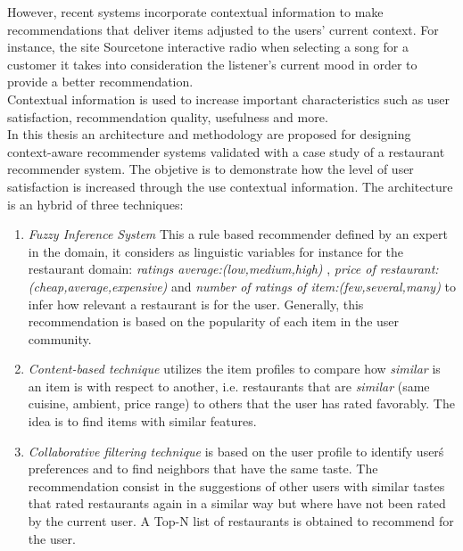 However, recent systems incorporate contextual
information to make recommendations that deliver items adjusted
to the users' current context. For instance, the site Sourcetone %
interactive radio \cite{huq2010automated} when selecting a song for
a customer it takes into consideration the listener's current mood in
order to provide a better recommendation. \\ Contextual information is used to
increase important characteristics such as user satisfaction, recommendation 
quality, usefulness and more.\\
In this thesis an architecture and methodology are proposed for designing context-aware
recommender systems validated with a case study of a restaurant recommender system. The objetive is to
demonstrate how the level of user satisfaction is increased through
the use contextual information. The architecture is an hybrid of three techniques:

\begin{enumerate}  
\item \textit{Fuzzy Inference System} This a rule based recommender defined by an expert
in the domain, it considers as linguistic variables for instance for
the restaurant domain: \textit{ratings average:(low,medium,high)} ,
\textit{price of restaurant:(cheap,average,expensive)} and 
\textit{number of ratings of item:(few,several,many)} to infer how
relevant a restaurant is for the user. Generally, this recommendation
is based on the popularity of each item in the user community.
\item \textit{Content-based technique} utilizes the item profiles 
to compare how \textit{similar} is an item is with respect to another, i.e.  
restaurants that are \textit{similar} (same cuisine, ambient, price range)  to others 
that the user has rated favorably. The idea is to find items 
with similar features. 
\item \textit{Collaborative filtering
technique} is based on the user profile to identify user\'s
preferences and to find neighbors that have the same taste. The
recommendation consist in the suggestions of other users with similar
tastes that rated restaurants again in a similar way but
where have not been rated by the current user.
A Top-N list of restaurants is obtained to recommend for the user. 
\end{enumerate} 

